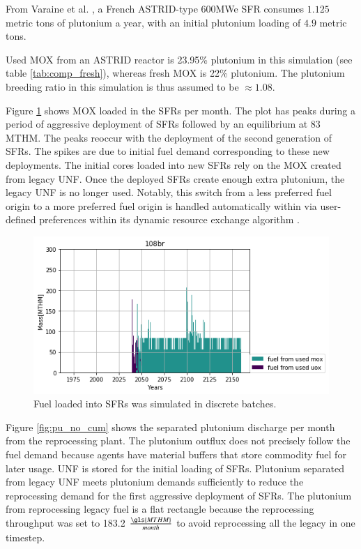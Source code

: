 From Varaine et al. \cite{varaine_pre-conceptual_2012}, a French
ASTRID-type 600\gls{MWe} \gls{SFR} consumes $1.125$ metric tons of
plutonium a year, with an initial plutonium loading of $4.9$ metric tons.
 
Used \gls{MOX} from an ASTRID reactor is 23.95\% plutonium
in this simulation (see table \ref{tab:comp_fresh}), whereas fresh \gls{MOX} is 22\% plutonium.
The plutonium breeding ratio in this simulation is thus assumed to be
$\approx 1.08$.

Figure \ref{fig:fuel} shows \gls{MOX} loaded in the \glspl{SFR} per month.  The plot 
has peaks during a period of aggressive deployment of \glspl{SFR} followed by 
an equilibrium at 83 \gls{MTHM}. The peaks reoccur with the deployment of the 
second generation of \glspl{SFR}.  The spikes are due to initial fuel demand 
corresponding to these new deployments.  The initial cores loaded into new 
\glspl{SFR} rely on the \gls{MOX} created from legacy \gls{UNF}. Once the 
deployed \glspl{SFR} create enough extra plutonium, the legacy \gls{UNF} is no 
longer used. Notably, this switch from a less preferred fuel origin to a more 
preferred fuel origin is handled automatically within \Cyclus via user-defined preferences 
within its dynamic resource exchange algorithm \cite{gidden_methodology_2016}.


\begin{figure}[htbp!]
	\begin{center}
		\includegraphics[width=1.0\textwidth]{./images/french-transition/where_fuel.png}
	\end{center}
	\caption{Fuel loaded into \glspl{SFR} was simulated in discrete 
        batches.}
	\label{fig:fuel}
\end{figure}

Figure \ref{fig:pu_no_cum} shows the separated plutonium discharge per 
month from the reprocessing plant. The plutonium outflux does not precisely 
follow the fuel demand because \Cyclus agents have material buffers that 
store commodity fuel for later usage. 
\gls{UNF} is stored for the initial loading of \glspl{SFR}.  Plutonium separated 
from legacy \gls{UNF} meets plutonium demands sufficiently to reduce the 
reprocessing demand for the first aggressive deployment of \glspl{SFR}.  
The plutonium from reprocessing legacy fuel is a flat rectangle because the 
reprocessing throughput was set to 183.2 $\frac{\gls{MTHM}}{month}$ to 
avoid reprocessing all the legacy in one timestep.
 

